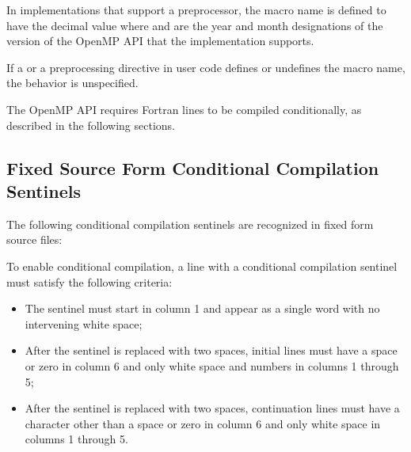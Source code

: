 In implementations that support a preprocessor, the  macro name is 
defined to have the decimal value  where  and  are 
the year and month designations of the version of the OpenMP API that the 
implementation supports.

If a  or a  preprocessing directive in user
code defines or undefines the  macro name, the behavior is
unspecified.



\begin{fortranspecific}
The OpenMP API requires Fortran lines to be compiled conditionally, as described in
the following sections.



\subsection{Fixed Source Form Conditional Compilation Sentinels}
\label{subsec:Fixed Source Form Conditional Compilation Sentinels}

The following conditional compilation sentinels are recognized in fixed form source
files:


To enable conditional compilation, a line with a conditional compilation sentinel must
satisfy the following criteria:

\begin{itemize}
\item The sentinel must start in column 1 and appear as a single word with no 
      intervening white space;

\item After the sentinel is replaced with two spaces, initial lines must have a 
      space or zero in column 6 and only white space and numbers in columns 1 
      through 5;

\item After the sentinel is replaced with two spaces, continuation lines must have 
      a character other than a space or zero in column 6 and only white space in 
      columns 1 through 5.
\end{itemize}


\end{fortranspecific}
